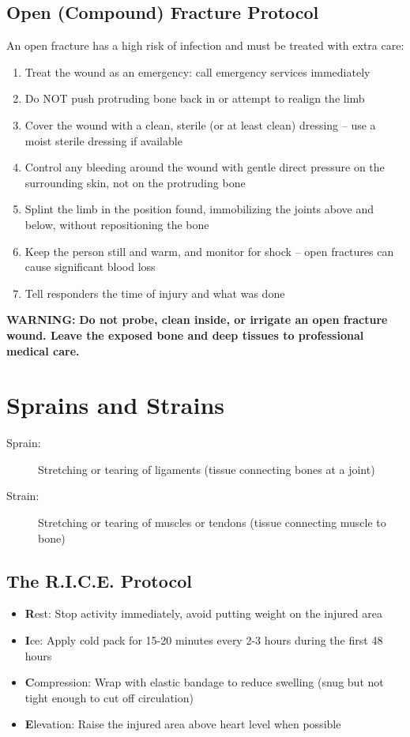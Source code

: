 \subsection{Open (Compound) Fracture Protocol}

An open fracture has a high risk of infection and must be treated with extra care:

\begin{enumerate}[leftmargin=*]
\item Treat the wound as an emergency: call emergency services immediately
\item Do NOT push protruding bone back in or attempt to realign the limb
\item Cover the wound with a clean, sterile (or at least clean) dressing -- use a moist sterile dressing if available
\item Control any bleeding around the wound with gentle direct pressure on the surrounding skin, not on the protruding bone
\item Splint the limb in the position found, immobilizing the joints above and below, without repositioning the bone
\item Keep the person still and warm, and monitor for shock -- open fractures can cause significant blood loss
\item Tell responders the time of injury and what was done
\end{enumerate}

\textbf{WARNING:} \textbf{Do not probe, clean inside, or irrigate an open fracture wound. Leave the exposed bone and deep tissues to professional medical care.}

\section{Sprains and Strains}

\begin{description}
  \item[Sprain:] Stretching or tearing of ligaments (tissue connecting bones at a joint)
  \item[Strain:] Stretching or tearing of muscles or tendons (tissue connecting muscle to bone)
\end{description}

\subsection{The R.I.C.E. Protocol}

\begin{itemize}[leftmargin=*]
  \item \textbf{R}est: Stop activity immediately, avoid putting weight on the injured area
  \item \textbf{I}ce: Apply cold pack for 15-20 minutes every 2-3 hours during the first 48 hours
  \item \textbf{C}ompression: Wrap with elastic bandage to reduce swelling (snug but not tight enough to cut off circulation)
  \item \textbf{E}levation: Raise the injured area above heart level when possible
\end{itemize}

